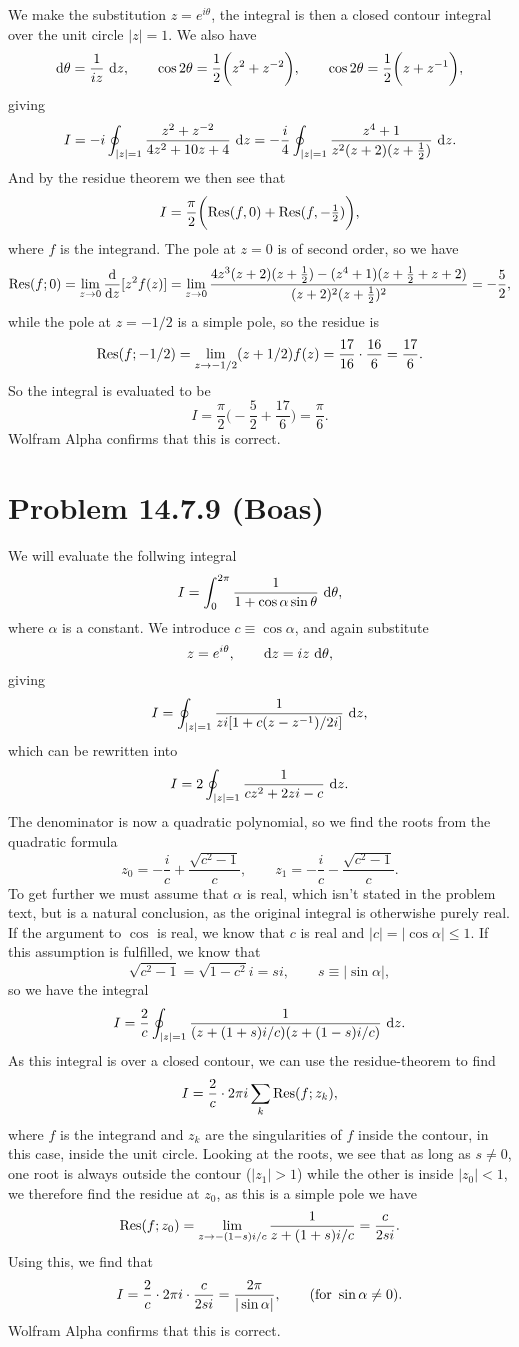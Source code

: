 \documentclass[a4paper, 11pt, titlepage, english]{article}
\renewcommand{\d}{{\rm d}}
\newcommand{\Res}[2]{{\rm Res}(#1;#2)}
\begin{document}
We make the substitution $z = e^{i\theta}$, the integral is then a closed contour integral over the unit circle $|z|=1$. We also have
$$\d\theta = \frac{1}{iz}\ \d z, \qquad \cos2\theta = \frac{1}{2}\bigg(z^2 + z^{-2}\bigg), \qquad \cos2\theta = \frac{1}{2}\bigg(z + z^{-1}\bigg),$$
giving
$$I = -i\oint_{|z|=1} \frac{z^2 + z^{-2}}{4z^2 + 10z  + 4} \ \d z = -\frac{i}{4}\oint_{|z|=1} \frac{z^4 + 1}{z^2(z+2)(z+\tfrac{1}{2})} \ \d z. $$
And by the residue theorem we then see that
$$I = \frac{\pi}{2}\bigg({\rm Res}(f,0) + {\rm Res}(f,-\tfrac{1}{2})\bigg),$$
where $f$ is the integrand. The pole at $z=0$ is of second order, so we have
$$\Res{f}{0} = \lim_{z \to 0} \frac{\d}{\d z} [z^2f(z)] = \lim_{z\to 0} \frac{4z^3(z+2)(z+\tfrac{1}{2}) - (z^4 +1)(z+\tfrac{1}{2} + z + 2)}{(z+2)^2(z+\tfrac{1}{2})^2} = -\frac{5}{2},$$
while the pole at $z=-1/2$ is a simple pole, so the residue is
$$\Res{f}{-1/2} = \lim_{z \to -1/2} (z+1/2)f(z) = \frac{17}{16}\cdot\frac{16}{6} = \frac{17}{6}.$$
So the integral is evaluated to be
$$I = \frac{\pi}{2}\bigg(-\frac{5}{2} + \frac{17}{6}\bigg) = \frac{\pi}{6}.$$
Wolfram Alpha confirms that this is correct.

\clearpage
\section*{Problem 14.7.9 (Boas)}
We will evaluate the follwing integral
$$I = \int_0^{2\pi} \frac{1}{1+\cos\alpha\sin\theta} \ \d\theta,$$
where $\alpha$ is a constant. We introduce $c \equiv \cos \alpha$, and again substitute 
$$z = e^{i\theta}, \qquad \d z = iz\ \d \theta,$$
giving
$$I = \oint_{|z|=1} \frac{1}{zi[1+c(z - z^{-1})/2i]} \ \d z,$$
which can be rewritten into
$$I = 2\oint_{|z|=1} \frac{1}{cz^2 + 2zi - c} \ \d z.$$
The denominator is now a quadratic polynomial, so we find the roots from the quadratic formula
$$z_0 = -\frac{i}{c} + \frac{\sqrt{c^2 - 1}}{c}, \qquad z_1 = -\frac{i}{c} - \frac{\sqrt{c^2 - 1}}{c}.$$
To get further we must assume that $\alpha$ is real, which isn't stated in the problem text, but is a natural conclusion, as the original integral is otherwishe purely real. If the argument to $\cos$ is real, we know that $c$ is real and $|c| = |\cos\alpha| \leq 1$. If this assumption is fulfilled, we know that
$$\sqrt{c^2 -1} = \sqrt{1-c^2}i = si, \qquad s \equiv |\sin\alpha|,$$
so we have the integral
$$I = \frac{2}{c}\oint_{|z|=1} \frac{1}{(z+(1+s)i/c)(z+(1-s)i/c)} \ \d z.$$
As this integral is over a closed contour, we can use the residue-theorem to find
$$I = \frac{2}{c} \cdot 2\pi i\sum_k \Res{f}{z_k},$$
where $f$ is the integrand and $z_k$ are the singularities of $f$ inside the contour, in this case, inside the unit circle. Looking at the roots, we see that as long as $s\neq 0$, one root is always outside the contour ($|z_1|>1$) while the other is inside $|z_0|<1$, we therefore find the residue at $z_0$, as this is a simple pole we have
$$\Res{f}{z_0} = \lim_{z\to -(1-s)i/c} \frac{1}{z + (1+s)i/c} = \frac{c}{2si}.$$
Using this, we find that
$$I = \frac{2}{c}\cdot 2\pi i \cdot \frac{c}{2si} = \frac{2\pi}{|\sin \alpha|},\qquad ({\rm for\ \sin\alpha\neq0)}.$$
Wolfram Alpha confirms that this is correct.
\end{document}

